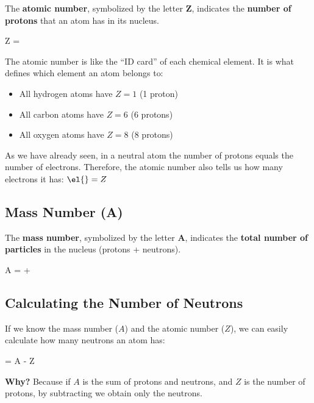 The \textbf{atomic number}, symbolized by the letter \( \bm{Z} \), indicates the \textbf{number of protons} that an atom has in its nucleus.
\begin{centeredequation}
    Z = 
\end{centeredequation}
The atomic number is like the ``ID card'' of each chemical element. It is what defines which element an atom belongs to:
\begin{itemize}
    \item All hydrogen atoms have \( Z = 1 \) (1 proton)
    \item All carbon atoms have \( Z = 6 \) (6 protons)
    \item All oxygen atoms have \( Z = 8 \) (8 protons)
\end{itemize}
\begin{remark}
    As we have already seen, in a neutral atom the number of protons equals the number of electrons. Therefore, the atomic number also tells us how many electrons it has: \( \el{} = Z \)
\end{remark}
\subsection{Mass Number (A)}
The \textbf{mass number}, symbolized by the letter \( \bm{A} \), indicates the \textbf{total number of particles} in the nucleus (protons + neutrons).
\begin{centeredequation}
    A =  + 
\end{centeredequation}

\subsection{Calculating the Number of Neutrons}

If we know the mass number (\( A \)) and the atomic number (\( Z \)), we can easily calculate how many neutrons an atom has:
\begin{centeredequation}
     = A - Z
\end{centeredequation}
\begin{remark}
    \textbf{Why?} Because if \( A \) is the sum of protons and neutrons, and \( Z \) is the number of protons, by subtracting we obtain only the neutrons.
\end{remark}
